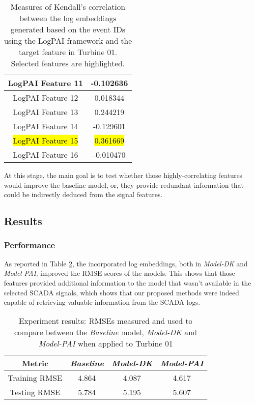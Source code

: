 \begin{table}[H]
{\begin{tabular}{|c|c|}
        \hline
        \multicolumn{1}{|m{0.25\textwidth}|}{LogPAI Feature 11} & -0.102636\\
        \hline
        \multicolumn{1}{|m{0.25\textwidth}|}{LogPAI Feature 12} & 0.018344\\
        \hline
        \multicolumn{1}{|m{0.25\textwidth}|}{LogPAI Feature 13} & 0.244219\\
        \hline
        \multicolumn{1}{|m{0.25\textwidth}|}{LogPAI Feature 14} & -0.129601\\
        \hline
        \multicolumn{1}{|m{0.25\textwidth}|}{\hl{LogPAI Feature 15}} & \hl{0.361669}\\
        \hline
        \multicolumn{1}{|m{0.25\textwidth}|}{LogPAI Feature 16} & -0.010470\\
        \hline
    \end{tabular}
    \caption{Measures of Kendall's correlation between the log embeddings generated based on the event IDs using the LogPAI framework and the target feature in Turbine 01. Selected features are highlighted.}
    \label{tab:expII:logpai-feats}
    }
    \end{table}

At this stage, the main goal is to test whether those highly-correlating features would improve the baseline model, or, 
they provide redundant information that could be indirectly deduced from the signal features.

\subsection{Results}
\subsubsection{Performance}
As reported in Table \ref{tab:Experiment II results}, the incorporated log embeddings, both in \emph{Model-DK} and \emph{Model-PAI}, improved the RMSE scores of the models. 
This shows that those features provided additional information to the model that wasn't available in the selected SCADA signals, which shows that our proposed methods 
were indeed capable of retrieving valuable information from the SCADA logs.

\begin{table}[H]
    \centering
\begin{tabular}{|c|c|c|c|}
\hline
     \textbf{Metric} & \textbf{\emph{Baseline}} & \textbf{\emph{Model-DK}} & \textbf{\emph{Model-PAI}}\\
     \hline
     Training RMSE & 4.864 & 4.087 & 4.617\\
     \hline
     Testing RMSE & 5.784 & 5.195 & 5.607\\
\hline
\end{tabular}
\caption{Experiment results: RMSEs measured and used to compare between the \emph{Baseline} model, \emph{Model-DK} and \emph{Model-PAI} when applied to Turbine 01}
    \label{tab:Experiment II results}
\end{table}

